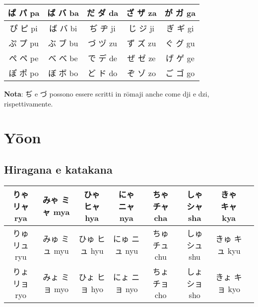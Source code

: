 \documentclass{article}
\begin{document}
        \begin{center}
            \begin{japanese}
                \begin{tabular}{|c|c|c|c|c|}
                    \hline
                    ぱ パ pa & ば バ ba & だ ダ da & ざ ザ za & が ガ ga\\
                    \hline
                    ぴ ピ pi & ば バ bi & ぢ ヂ ji & じ ジ ji & ぎ ギ gi\\
                    \hline
                    ぷ プ pu & ぶ ブ bu & づ ヅ zu & ず ズ zu & ぐ グ gu\\
                    \hline
                    ぺ ペ pe & べ べ be & で デ de & ぜ ゼ ze & げ ゲ ge\\
                    \hline
                    ぽ ポ po & ぼ ボ bo & ど ド do & ぞ ゾ zo & ご ゴ go\\
                    \hline
                \end{tabular}
            \end{japanese}
        \end{center}

        \textbf{Nota}: \textjapanese{ぢ} e \textjapanese{づ} possono essere scritti in rōmaji anche come \textjapanese{dji} e \textjapanese{dzi}, rispettivamente.

    \section{Yōon}

        \subsection{Hiragana e katakana}

            \begin{center}
                \begin{japanese}
                    \begin{tabular}{|c|c|c|c|c|c|c|c|}
                        \hline
                        りゃ リャ rya & みゃ ミャ mya & ひゃ ヒャ hya & にゃ ニャ nya & ちゃ チャ cha & しゃ シャ sha & きゃ キャ kya\\
                        \hline
                        りゅ リュ ryu & みゅ ミュ myu & ひゅ ヒュ hyu & にゅ ニュ nyu & ちゅ チュ chu & しゅ シュ shu & きゅ キュ kyu\\
                        \hline
                        りょ リョ ryo & みょ ミョ myo & ひょ ヒョ hyo & にょ ニョ nyo & ちょ チョ cho & しょ ショ sho & きょ キョ kyo\\
                        \hline
                    \end{tabular}
                \end{japanese}
            \end{center}
\end{document}
